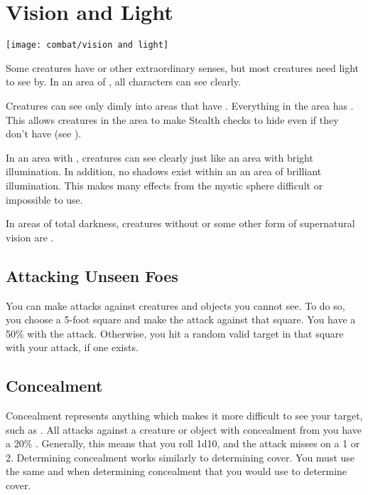 \section{Vision and Light}\label{Vision and Light}
    \texttt{[image: combat/vision and light]}

    Some creatures have  or other extraordinary senses, but most creatures need light to see by. 
    In an area of , all characters can see clearly.

    Creatures can see only dimly into areas that have .
    Everything in the area has .
    This allows creatures in the area to make Stealth checks to hide even if they don't have  (see ).

    In an area with , creatures can see clearly just like an area with bright illumination.
    In addition, no shadows exist within an an area of brilliant illumination.
    This makes many effects from the  mystic sphere difficult or impossible to use.

    In areas of total darkness, creatures without  or some other form of supernatural vision are \blinded.

    \subsection{Attacking Unseen Foes}
        You can make  attacks against creatures and objects you cannot see.
        To do so, you choose a 5-foot square and make the attack against that square.
        You have a 50\%  with the attack.
        Otherwise, you hit a random valid target in that square with your attack, if one exists.

    \subsection{Concealment}\label{Concealment}
        Concealment represents anything which makes it more difficult to see your target, such as .
        All  attacks against a creature or object with concealment from you have a 20\% .
        Generally, this means that you roll 1d10, and the attack misses on a 1 or 2.
        Determining concealment works similarly to determining cover.
        You must use the same  and  when determining concealment that you would use to determine cover.

